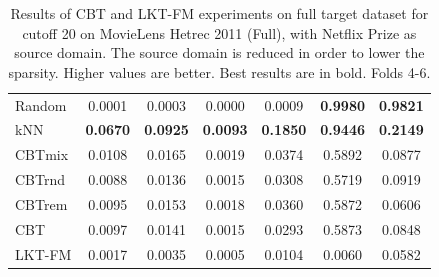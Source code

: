 \begin{table}[hbt]
\begin{tabulary}{\textwidth}{|L|CCCCCC|}
Random & 0.0001 & 0.0003 & 0.0000 & 0.0009 & \textbf{0.9980} & \textbf{0.9821} \\
kNN & \textbf{0.0670} & \textbf{0.0925} & \textbf{0.0093} & \textbf{0.1850} & \textbf{0.9446} & \textbf{0.2149} \\
CBTmix & 0.0108 & 0.0165 & 0.0019 & 0.0374 & 0.5892 & 0.0877 \\
CBTrnd & 0.0088 & 0.0136 & 0.0015 & 0.0308 & 0.5719 & 0.0919 \\
CBTrem & 0.0095 & 0.0153 & 0.0018 & 0.0360 & 0.5872 & 0.0606 \\
CBT & 0.0097 & 0.0141 & 0.0015 & 0.0293 & 0.5873 & 0.0848 \\
LKT-FM & 0.0017 & 0.0035 & 0.0005 & 0.0104 & 0.0060 & 0.0582 \\
\hline
\end{tabulary}
\caption{Results of CBT and LKT-FM experiments on full target dataset for cutoff 20 on MovieLens Hetrec 2011 (Full), with Netflix Prize as source domain. The source domain is reduced in order to lower the sparsity. Higher values are better. Best results are in bold. Folds 4-6.}
\end{table}

